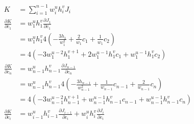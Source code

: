\documentclass{article}
\begin{document}

\begin{align*}
  K &= \sum_{i=1}^{n-1}w_i^uh_i^vJ_i \\
  \frac{\partial K}{\partial c_1}
  &= w_1^uh_1^v\frac{\partial J_1}{\partial c_1} \\
  &= w_1^uh_1^v4\left(-\frac{3h_1}{w_1^2}+\frac{2}{w_1}c_1+\frac{1}{w_1}c_2\right) \\
  &= 4\left(-3w_1^{u-2}h_1^{v+1}+2w_1^{u-1}h_1^vc_1+w_1^{u-1}h_1^vc_2\right) \\
  \frac{\partial K}{\partial c_n}
  &= w_{n-1}^uh_{n-1}^v\frac{\partial J_{n-1}}{\partial c_n} \\
  &= w_{n-1}^uh_{n-1}^v4\left(-\frac{3h_{n-1}}{w_{n-1}^2}+\frac{1}{w_{n-1}}c_{n-1}+\frac{2}{w_{n-1}}c_n\right) \\
  &= 4\left(-3w_{n-1}^{u-2}h_{n-1}^{v+1}+w_{n-1}^{u-1}h_{n-1}^vc_{n-1}+w_{n-1}^{u-1}h_{n-1}^vc_n\right) \\
  \frac{\partial K}{\partial c_i}
  &= w_{i-1}^uh_{i-1}^v\frac{\partial J_{i-1}}{\partial c_i}
  + w_i^uh_i^v\frac{\partial J_i}{\partial c_i}
\end{align*}
\end{document}
